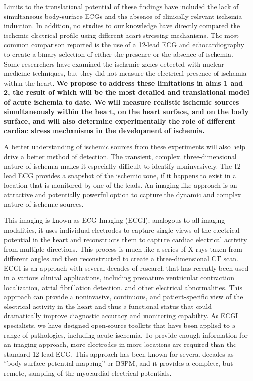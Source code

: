 Limits to the translational potential of these findings have included the lack of simultaneous body-surface ECGs and the absence of clinically relevant ischemia induction. In addition, no studies to our knowledge have directly compared the ischemic electrical profile using different heart stressing mechanisms. The most common comparison reported is the use of a 12-lead ECG and echocardiography to create a binary selection of either the presence or the absence of ischemia.\cite{BLZ:Sha1998a,BLZ:Dho2000,BLZ:Mai1994} Some researchers have examined the ischemic zones detected with nuclear medicine techniques, but they did not measure the electrical presence of ischemia within the heart.\cite{BLZ:San1998} \textbf{We propose to address these limitations in aims 1 and 2, the result of which will be the most detailed and translational model of acute ischemia to date. We will measure realistic ischemic sources simultaneously within the heart, on the heart surface, and on the body surface, and will also determine experimentally the role of different cardiac stress mechanisms in the development of ischemia.}

A better understanding of ischemic sources from these experiments will also help drive a better method of detection. The transient, complex, three-dimensional nature of ischemia makes it especially difficult to identify noninvasively. The 12-lead ECG provides a snapshot of the ischemic zone, if it happens to exist in a location that is monitored by one of the leads. An imaging-like approach is an attractive and potentially powerful option to capture the dynamic and complex nature of ischemic sources.

This imaging is known as ECG Imaging (ECGI)\cite{RSM:Bro97b,RSM:Pul2010,RSM:Rud2015}; analogous to all imaging modalities, it uses individual electrodes to capture single views of the electrical potential in the heart and reconstructs them to capture cardiac electrical activity from multiple directions.  This process is much like a series of X-rays taken from different angles and then reconstructed to create a three-dimensional CT scan. ECGI is an approach with several decades of research that has recently been used in a various clinical applications, including premature ventricular contraction localization, atrial fibrillation detection, and other electrical abnormalities.\cite{RSM:Sha2015,BLZ:Pot2014,BLZ:Dub2015,BLZ:Wan2016a,RSM:Sha2015,BLZ:Wan2018,RSM:Ost97,RSM:Mac98,RSM:Bro99,RSM:Clu2018,RSM:Clu2015} This approach can provide a noninvasive, continuous, and patient-specific view of the electrical activity in the heart and thus a functional status that could dramatically improve diagnostic accuracy and monitoring capability. As ECGI specialists, we have designed open-source toolkits that have been applied to a range of pathologies, including acute ischemia.\cite{BMB:Mac95,BMB:Bur2011,BMB:Bur2018a,BMB:Bur2018b,BLZ:Tat2018} To provide enough information for an imaging approach, more electrodes in more locations are required than the standard 12-lead ECG. This approach has been known for several decades as ``body-surface potential mapping'' or BSPM, and it provides a complete, but remote, sampling of the myocardial electrical potentials. \cite{BLZ:Mil1980,BLZ:Fox1979,BLZ:Hor2001,RSM:Koz95}

